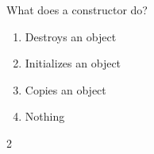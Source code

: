 \item
What does a constructor do?
\begin{enumerate}
\item Destroys an object
\item Initializes an object
\item Copies an object
\item Nothing
\end{enumerate}
\begin{solution}
2
\end{solution}
